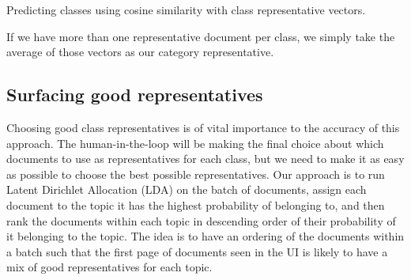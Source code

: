 \begin{algorithm}[!h]
\caption{Predicting classes using cosine similarity with class representative vectors.}
\label{algo:classification}
\end{algorithm}

If we have more than one representative document per class, we simply take the average of those vectors as our category representative.

\subsection{Surfacing good representatives}
Choosing good class representatives is of vital importance to the accuracy of this approach. The human-in-the-loop will be making the final choice about which documents to use as representatives for each class, but we need to make it as easy as possible to choose the best possible representatives. Our approach is to run Latent Dirichlet Allocation (LDA) on the batch of documents, assign each document to the topic it has the highest probability of belonging to, and then rank the documents within each topic in descending order of their probability of it belonging to the topic. The idea is to have an ordering of the documents within a batch such that the first page of documents seen in the UI is likely to have a mix of good representatives for each topic.

